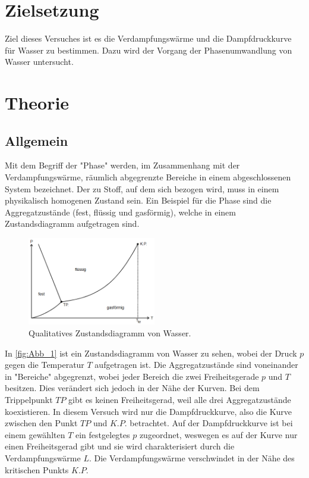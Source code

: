 \section{Zielsetzung}
\label{sec: Zielsetzung}
Ziel dieses Versuches ist es die Verdampfungswärme und die Dampfdruckkurve für Wasser zu bestimmen. 
Dazu wird der Vorgang der Phasenumwandlung von Wasser untersucht.

\section{Theorie}
\label{sec:Theorie}
\subsection{Allgemein} %
\label{sub:Allgemein}
Mit dem Begriff der "Phase" werden, im Zusammenhang mit der Verdampfungswärme, räumlich abgegrenzte Bereiche in einem abgeschlossenen System bezeichnet.
Der zu Stoff, auf dem sich bezogen wird, muss in einem physikalisch homogenen Zustand sein. 
Ein Beispiel für die Phase sind die Aggregatzustände (fest, flüssig und gasförmig), welche in einem Zustandsdiagramm aufgetragen sind.
\begin{figure}[H]
    \centering
    \includegraphics[width=0.5\textwidth]{build/Abb_1.PNG}
    \caption {Qualitatives Zustandsdiagramm von Wasser.\cite{v203}}
    \label{fig:Abb_1}
\end{figure}
In \autoref{fig:Abb_1} ist ein Zustandsdiagramm von Wasser zu sehen, wobei der Druck $p$ gegen die Temperatur $T$ aufgetragen ist.
Die Aggregatzustände sind voneinander in "Bereiche" abgegrenzt, wobei jeder Bereich die zwei Freiheitsgerade $p$ und $T$ besitzen.
Dies verändert sich jedoch in der Nähe der Kurven. 
Bei dem Trippelpunkt $TP$ gibt es keinen Freiheitsgerad, weil alle drei Aggregatzustände koexistieren.
In diesem Versuch wird nur die Dampfdruckkurve, also die Kurve zwischen den Punkt $TP$ und $K.P.$ betrachtet.
Auf der Dampfdruckkurve ist bei einem gewählten $T$ ein festgelegtes $p$ zugeordnet, weswegen es auf der Kurve nur einen Freiheitsgerad gibt und sie wird charakterisiert durch die Verdampfungswärme $L$.
Die Verdampfungswärme verschwindet in der Nähe des kritischen Punkts $K.P.$

